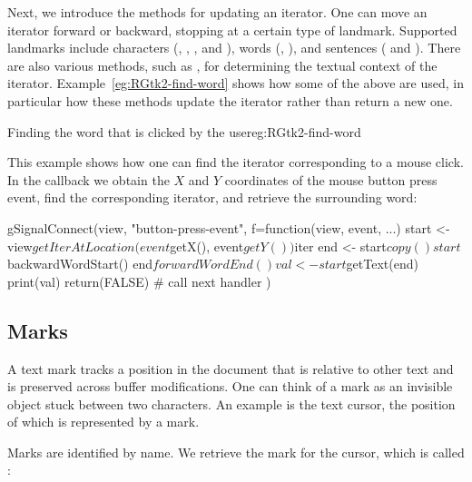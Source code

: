 Next, we introduce the methods for updating an iterator. One can move
an iterator forward or backward, stopping at a certain type of
landmark. Supported landmarks include characters
(,
,
, and
), words
(,
), and sentences
( and
).  There are also various
methods, such as , for determining the
textual context of the iterator. Example~\ref{eg:RGtk2-find-word}
shows how some of the above are used, in particular how these methods
update the iterator rather than return a new one.

\begin{example}{Finding the word that is clicked by the user}{eg:RGtk2-find-word}

This example shows how one can find the iterator corresponding to a
mouse click. In the callback we obtain the $X$ and $Y$ coordinates of
the mouse button press event, find the corresponding iterator, and
retrieve the surrounding word:
\begin{Schunk}
\begin{Sinput}
 gSignalConnect(view, "button-press-event", 
        f=function(view, event, ...) {
          start <- view$getIterAtLocation(event$getX(), 
                                          event$getY())$iter
          end <- start$copy()
          start$backwardWordStart()
          end$forwardWordEnd()
          val <- start$getText(end)
          print(val)
          return(FALSE) # call next handler
        })
\end{Sinput}
\end{Schunk}
\end{example}

\subsection{Marks}

A text mark tracks a position in the document that is relative to
other text and is preserved across buffer modifications. One can think
of a mark as an invisible object stuck between two characters. An
example is the text cursor, the position of which is represented by a
mark.

Marks are identified by name. We retrieve the mark for the
cursor, which is called :
\begin{Schunk}
\end{Schunk}

